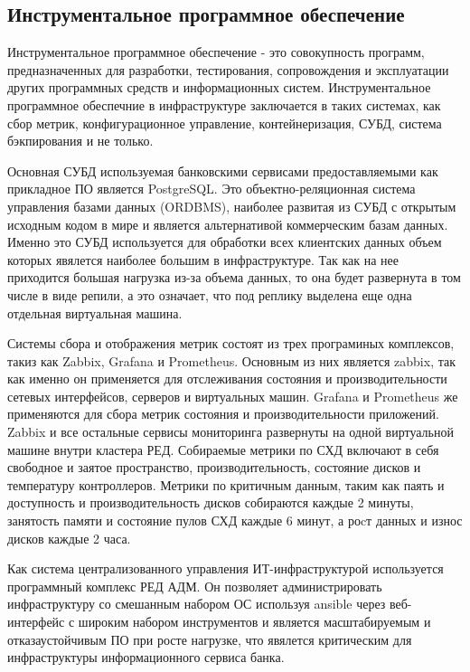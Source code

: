 \documentclass[14pt, a4paper]{extarticle}
\begin{document}
\subsection{Инструментальное программное обеспечение}

Инструментальное программное обеспечение - это совокупность программ, предназначенных для
разработки, тестирования, сопровождения и эксплуатации других программных средств и
информационных систем. Инструментальное программное обеспечние в инфраструктуре заключается
в таких системах, как сбор метрик, конфигурационное управление, контейнеризация,
СУБД, система бэкпирования и не только.

Основная СУБД используемая банковскими сервисами предоставляемыми как прикладное ПО
является PostgreSQL. Это объектно-реляционная система управления базами данных (ORDBMS),
наиболее развитая из СУБД с открытым исходным кодом в мире и является альтернативой
коммерческим базам данных. Именно это СУБД используется для обработки всех клиентских
данных объем которых явялется наиболее большим в инфраструктуре. Так как на нее приходится
большая нагрузка из-за объема данных, то она будет развернута в том числе в виде репили, а
это означает, что под реплику выделена еще одна отдельная виртуальная машина.

Системы сбора и отображения метрик состоят из трех програминых комплексов, такиз как Zabbix,
Grafana и Prometheus. Основным из них является zabbix, так как именно он применяется для
отслеживания состояния и производительности сетевых интерфейсов, серверов и виртуальных машин.
Grafana и Prometheus же применяются для сбора метрик состояния и производительности приложений.
Zabbix \cite{zabbix} и все остальные сервисы мониторинга развернуты на одной виртуальной машине внутри кластера РЕД.
Собираемые метрики по СХД включают в себя свободное и заятое пространство, производительность,
состояние дисков и температуру контроллеров. Метрики по критичным данным, таким как паять и доступность
и производительность дисков собираются каждые 2 минуты, занятость памяти и состояние пулов СХД
каждые 6 минут, а роcт данных и износ дисков каждые 2 часа.

Как система централизованного управления ИТ-инфраструктурой используется программный комплекс
РЕД АДМ. Он позволяет администрировать инфраструктуру со смешанным набором ОС используя
ansible через веб-интерфейс с широким набором инструментов и является масштабируемым и
отказаустойчивым ПО при росте нагрузке, что явялется критическим для инфраструктуры информационного
сервиса банка.
\end{document}
